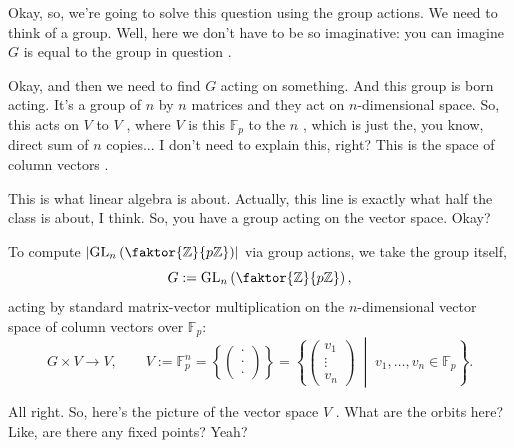 \begin{speech}[01:10:05 - 01:10:56]
Okay, so, we're going to solve this question using the group actions. We need to think of a group. Well, here we don't have to be so imaginative: you can imagine $G$ is equal to the group in question .

Okay, and then we need to find $G$ acting on something. And this group is born acting. It's a group of $n$ by $n$ matrices and they act on $n$-dimensional space. So, this acts on $V$ to $V$ , where $V$ is this $\mathbb{F}_p$ to the $n$ , which is just the, you know, direct sum of $n$ copies... I don't need to explain this, right? This is the space of column vectors .

This is what linear algebra is about. Actually, this line  is exactly what half the class is about, I think. So, you have a group acting on the vector space. Okay?
\end{speech}

\begin{content}
To compute $\left|\mathrm{GL}_n\left(\faktor{\mathbb{Z}}{p\mathbb{Z}}\right)\right|$ via group actions, we take the group itself,
\[
G := \mathrm{GL}_n\left(\faktor{\mathbb{Z}}{p\mathbb{Z}}\right),
\]
acting by standard matrix-vector multiplication on the $n$-dimensional vector space of column vectors over $\mathbb{F}_p$:
\[
G \times V \longrightarrow V, \qquad V := \mathbb{F}_p^n = \left\{ \begin{pmatrix} \cdot \\ \cdot \\ \cdot \end{pmatrix} \right\} = \left\{ \begin{pmatrix} v_1 \\ \vdots \\ v_n \end{pmatrix} \;\middle|\; v_1, \dots, v_n \in \mathbb{F}_p \right\}.
\]
\end{content}

\begin{speech}[01:10:57 - 01:11:16]
All right. So, here's the picture of the vector space $V$ . What are the orbits here? Like, are there any fixed points? Yeah?
\end{speech}

